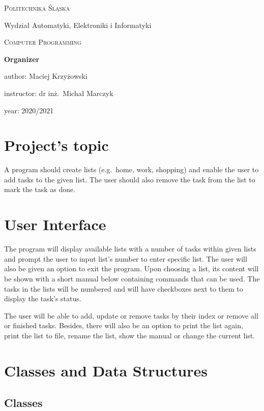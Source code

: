 \documentclass{article}
\begin{document}
\begin{titlepage}
	\centering
	{\scshape\LARGE Politechnika Śląska

    Wydział Automatyki, Elektroniki i Informatyki\par}
	\vspace{1cm}
	{\scshape\Large Computer Programming\par}
	\vspace{1.5cm}
	{\huge\bfseries Organizer\par}
	\vspace{2cm}
	\vfill
	author:
	Maciej Krzyżowski\par 
	instructor:
	dr inż.~Michał Marczyk\par
	year:
	2020/2021 
	\vfill
\end{titlepage}

\renewcommand*\contentsname{Summary}
\tableofcontents
\pagebreak

\section{Project’s topic}

A program should create lists (e.g.\ home, work, shopping) and enable the user to add tasks to the given list. The user should also remove the task from the list to mark the task as done.


\section{User Interface}

The program will display available lists with a number of tasks within given lists and prompt the user to input list's number to enter specific list. The user will also be given an option to exit the program. Upon choosing a list, its content will be shown with a short manual below containing commands that can be used. The tasks in the lists will be numbered and will have checkboxes next to them to display the task's status.

The user will be able to add, update or remove tasks by their index or remove all or finished tasks. Besides, there will also be an option to print the list again, print the list to file, rename the list, show the manual or change the current list.

\section{Classes and Data Structures}
\subsection{Classes}
\end{document}
